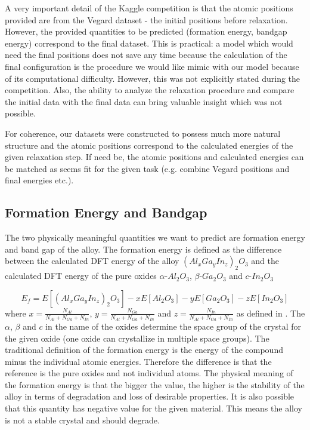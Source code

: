 \documentclass[11pt,oneside,czech,american]{book} %
\theoremstyle{plain}
\theoremstyle{definition}
\begin{document}
A very important detail of the Kaggle competition is that the atomic positions provided are from the Vegard dataset - the initial positions before relaxation. However, the provided quantities to be predicted (formation energy, bandgap energy) correspond to the final dataset. This is practical: a model which would need the final positions does not save any time because the calculation of the final configuration is the procedure we would like mimic with our model because of its computational difficulty. However, this was not explicitly stated during the competition. Also, the ability to analyze the relaxation procedure and compare the initial data with the final data can bring valuable insight which was not possible.

For coherence, our datasets were constructed to possess much more natural structure and the atomic positions correspond to the calculated energies of the given relaxation step. If need be, the atomic positions and calculated energies can be matched as seems fit for the given task (e.g. combine Vegard positions and final energies etc.).


\subsection{Formation Energy and Bandgap}
The two physically meaningful quantities we want to predict are formation energy and band gap of the alloy. The formation energy is defined as the difference between the calculated DFT energy of the alloy $(Al_{x}Ga_{y}In_{z})_2 O_3$ and the calculated DFT energy of the pure oxides $\alpha$-$Al_2 O_3$, $\beta$-$Ga_2 O_3$ and $c$-$In_2 O_3$

\begin{equation}
	E_f = E[(Al_{x}Ga_{y}In_{z})_2 O_3] - xE[Al_2 O_3] - yE[Ga_2 O_3] - zE[In_2 O_3] 
	\label{formation}
\end{equation}
where $x = \frac{N_{Al}}{N_{Al}+N_{Ga}+N_{In}}$, $y = \frac{N_{Ga}}{N_{Al}+N_{Ga}+N_{In}}$ and $z = \frac{N_{In}}{N_{Al}+N_{Ga}+N_{In}}$ as defined in \parencite{sutton19}. The $\alpha$, $\beta$ and $c$ in the name of the oxides determine the space group of the crystal for the given oxide (one oxide can crystallize in multiple space groups). The traditional definition of the formation energy is the energy of the compound minus the individual atomic energies. Therefore the difference is that the reference is the pure oxides and not individual atoms. The physical meaning of the formation energy is that the bigger the value, the higher is the stability of the alloy in terms of degradation and loss of desirable properties. It is also possible that this quantity has negative value for the given material. This means the alloy is not a stable crystal and should degrade.
\end{document}
